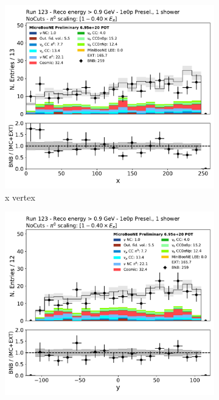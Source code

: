 \begin{figure}[H]
    \centering
    \begin{subfigure}{0.3\textwidth}
    \includegraphics[width=1.0\textwidth]{1e0p/High_E_Sideband/reco_nu_vtx_x.pdf}
    \caption{x vertex}
    \end{subfigure}
    \begin{subfigure}{0.3\textwidth}
    \includegraphics[width=1.0\textwidth]{1e0p/High_E_Sideband/reco_nu_vtx_y.pdf}

\end{subfigure}
\end{figure}
